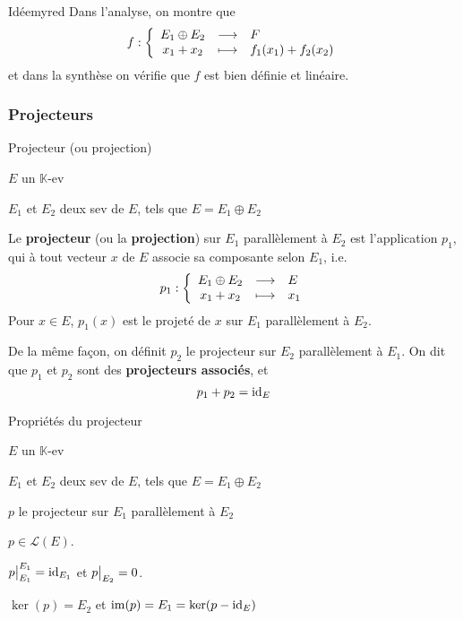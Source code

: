     \begin{demo}{Idée}{myred}
        Dans l’analyse, on montre que \[ \fonction{f}{E_1 \oplus E_2}{F}{x_1 + x_2}{f_1(x_1) + f_2(x_2)} \] et dans la synthèse on vérifie que $f$ est bien définie et linéaire.
    \end{demo}

    \subsubsection{Projecteurs}

    \begin{defi}{Projecteur (ou projection)}{}
        \begin{soient}
            \item $E$ un $\mathbb{K}$-ev
            \item $E_1$ et $E_2$ deux sev de $E$, tels que $E = E_1 \oplus E_2$
        \end{soient}
        Le \textbf{projecteur} (ou la \textbf{projection}) sur $E_1$ parallèlement à $E_2$ est l’application $p_1$, qui à tout vecteur $x$ de $E$ associe sa composante selon $E_1$, i.e. 
        \[ \fonction{p_1}{E_1 \oplus E_2}{E}{x_1 + x_2}{x_1} \]
        Pour $x \in E$, $p_1(x)$ est le projeté de $x$ sur $E_1$ parallèlement à $E_2$.

        De la même façon, on définit $p_2$ le projecteur sur $E_2$ parallèlement à $E_1$. On dit que $p_1$ et $p_2$ sont des \textbf{projecteurs associés}, et 
        \[ p_1 + p_2 = \operatorname{id}_E \]
    \end{defi}
    
    \begin{prop}{Propriétés du projecteur}{}
        \begin{soient}
            \item $E$ un $\mathbb{K}$-ev
            \item $E_1$ et $E_2$ deux sev de $E$, tels que $E = E_1 \oplus E_2$
            \item $p$ le projecteur sur $E_1$ parallèlement à $E_2$
        \end{soient}
        \begin{alors}
            \item $p \in \mathcal{L}(E)$.
            \item $\left.\kern-\nulldelimiterspace p \vphantom{\big|} \right|_{E_1}^{E_1} = \id_{E_1}$ et $\restr{p}{E_2} = 0$.
            \item $\ker(p) = E_2$ et $\operatorname{im}(p) = E_1 = \ker(p - \operatorname{id}_E)$
        \end{alors}
    \end{prop}
    

